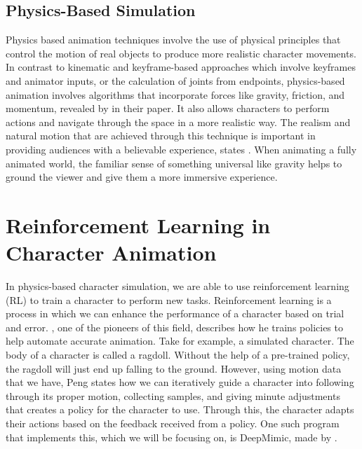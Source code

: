 \documentclass{l4proj}
\begin{document}
\subsection{Physics-Based Simulation}
Physics based animation techniques involve the use of physical principles that control the motion of real objects to produce more realistic character movements. In contrast to kinematic and keyframe-based approaches which involve keyframes and animator inputs, or the calculation of joints from endpoints, physics-based animation involves algorithms that incorporate forces like gravity, friction, and momentum, revealed by \cite{boeing07} in their paper. It also allows characters to perform actions and navigate through the space in a more realistic way. The realism and natural motion that are achieved through this technique is important in providing audiences with a believable experience, states \cite{Holden2017}. When animating a fully animated world, the familiar sense of something universal like gravity helps to ground the viewer and give them a more immersive experience.
\clearpage
\section{Reinforcement Learning in Character Animation}
In physics-based character simulation, we are able to use reinforcement learning (RL) to train a character to perform new tasks. Reinforcement learning is a process in which we can enhance the performance of a character based on trial and error. \cite{deepmimic}, one of the pioneers of this field, describes how he trains policies to help automate accurate animation. Take for example, a simulated character. The body of a character is called a ragdoll. Without the help of a pre-trained policy, the ragdoll will just end up falling to the ground. However, using motion data that we have, Peng states how we can iteratively guide a character into following through its proper motion, collecting samples, and giving minute adjustments that creates a policy for the character to use. Through this, the character adapts their actions based on the feedback received from a policy. One such program that implements this, which we will be focusing on, is DeepMimic, made by \cite{deepmimic}.
\end{document}
